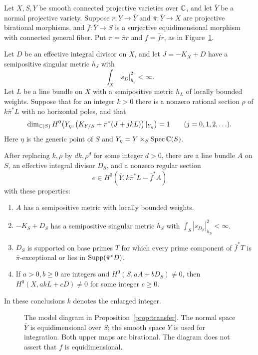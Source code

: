 \begin{proposition}\label{prop:transfer}
Let \(X,S,Y\) be smooth connected projective varieties over \(\mathbb C\), and
let \(\bar Y\) be a normal projective variety. Suppose
\(r:Y\to\bar Y\) and \(\bar\pi:\bar Y\to X\) are projective birational
morphisms, and \(\bar f:\bar Y\to S\) is a surjective equidimensional
morphism with connected general fiber. Put
\(\pi=\bar\pi r\) and \(f=\bar f r\), as in Figure~\ref{fig:models}.

Let \(D\) be an effective integral divisor on \(X\), and let
\(J=-K_X+D\) have a semipositive singular metric \(h_J\) with
\[
 \int_X |s_D|_{h_J}^2<\infty.
\]
Let \(L\) be a line bundle on \(X\) with a semipositive metric \(h_L\)
of locally bounded weights. Suppose that for an integer \(k>0\)
there is a nonzero rational section \(\rho\) of \(k\bar\pi^*L\)
with no horizontal poles, and that
\begin{equation}\label{eq:rank}
 \dim_{\mathbb C(S)}
 H^0\!\left(Y_\eta,
  \left(K_{Y/S}+\pi^*(J+jkL)\right)|_{Y_\eta}\right)=1
 \qquad(j=0,1,2,\ldots).
\end{equation}
Here \(\eta\) is the generic point of \(S\) and
\(Y_\eta=Y\times_S\operatorname{Spec}\mathbb C(S)\).

After replacing \(k,\rho\) by \(dk,\rho^d\) for some integer \(d>0\),
there are a line bundle \(A\) on \(S\), an effective integral divisor
\(D_S\), and a nonzero regular section
\[
 e\in H^0(\bar Y,k\bar\pi^*L-\bar f^*A)
\]
with these properties:
\begin{enumerate}[label=\textup{(\roman*)}]
\item \(A\) has a semipositive metric with locally bounded weights.
\item \(-K_S+D_S\) has a semipositive singular metric \(h_S\) with
      \(\int_S|s_{D_S}|_{h_S}^2<\infty\).
\item \(D_S\) is supported on base primes \(T\) for which every prime
      component of \(\bar f^*T\) is \(\bar\pi\)-exceptional or lies in
      \(\operatorname{Supp}(\bar\pi^*D)\).
\item If \(a>0,b\ge0\) are integers and \(H^0(S,aA+bD_S)\ne0\), then
      \(H^0(X,akL+cD)\ne0\) for some integer \(c\ge0\).
\end{enumerate}
In these conclusions \(k\) denotes the enlarged integer.
\end{proposition}

\begin{figure}[ht]
\centering
{}
\caption{The model diagram in Proposition~\ref{prop:transfer}.
The normal space \(\bar Y\) is equidimensional over \(S\); the smooth
space \(Y\) is used for integration. Both upper maps are birational.
The diagram does not assert that \(f\) is equidimensional.}
\label{fig:models}
\end{figure}

